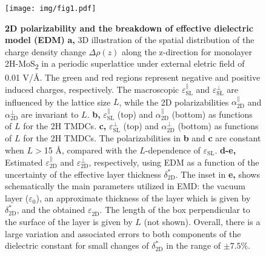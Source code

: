 \documentclass[journal=ancac3,manuscript=article,email=true,hyperref=true,keywords=false]{achemso}
\begin{document}
\begin{figure}[H]
\centering
\texttt{[image: img/fig1.pdf]}
\caption{\label{fig-1} \textbf{2D polarizability and the breakdown of
    effective dielectric model
    (EDM)} %
  \textbf{a,} 3D illustration of the spatial distribution of the
  charge density change $\Delta \rho(z)$ along the z-direction for
  monolayer 2H-MoS\textsubscript{2} in a periodic superlattice under
  external eletric field of 0.01 V/\AA{}.  The green and red regions
  represent negative and positive induced charges, respectively. The
  macroscopic $\varepsilon_{\mathrm{SL}}^{\parallel}$ and
  $\varepsilon_{\mathrm{SL}}^{\perp}$ are influenced by the lattice
  size $L$, while the 2D polarizabilities
  $\alpha_{\mathrm{2D}}^{\parallel}$ and
  $\alpha_{\mathrm{2D}}^{\perp}$ are invariant to $L$.
  \textbf{b,} $\varepsilon^{\parallel}_{\mathrm{SL}}$ (top) and
  $\alpha_{\mathrm{2D}}^{\parallel}$ (bottom) as functions of $L$ for
  the 2H TMDCs. 
  \textbf{c,} $\varepsilon^{\perp}_{\mathrm{SL}}$ (top)
  and $\alpha_{\mathrm{2D}}^{\perp}$ (bottom) as functions of $L$ for
  the 2H TMDCs. The polarizabilities in \textbf{b} and \textbf{c} are
  constant when $L>$15 \AA{}, compared with the $L$-dependence of
  $\varepsilon_{\mathrm{SL}}$. 
  {\bf d-e,} Estimated $\varepsilon_{\mathrm{2D}}^{\parallel}$ and 
  $\varepsilon_{\mathrm{2D}}^{\perp}$, respectively, using EDM  
  as a function of the uncertainty of the effective layer
  thickness $\delta^{*}_{\mathrm{2D}}$. The inset in {\bf e,} shows schematically the main parameters
  utilized in EMD: the vacuum layer ($\varepsilon^{}_{\mathrm{0}}$), an approximate thickness of the layer   which is given by $\delta^{*}_{\mathrm{2D}}$, and the obtained $\varepsilon^{}_{\mathrm{2D}}$. The length of the box perpendicular to the surface of the layer is given by $L$ (not shown). 
  Overall, there is a large variation and associated errors
  to both components of the dielectric constant for small changes of $\delta^{*}_{\mathrm{2D}}$ in the range of $\pm7.5$\%.  
}
\end{figure}
\end{document}
